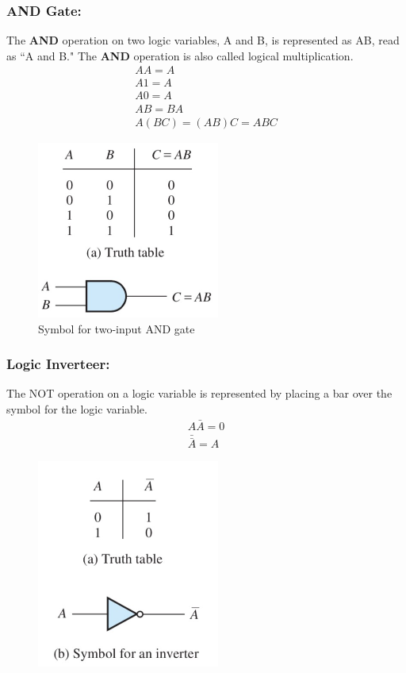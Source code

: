 \documentclass[a4paper,12]{article}
\begin{document}
     \subsubsection{AND Gate:}
     The \textbf{AND} operation on two logic variables, A and B, is represented as AB, read as ``A and B." The \textbf{AND} operation is also called logical multiplication.
     \begin{gather}
         AA=A\\
         A1=A\\
         A0=A\\
         AB=BA\\
         A(BC)=(AB)C=ABC
     \end{gather}
     \begin{figure}[H]
         \centering
         \captionsetup{labelformat=empty}
         \includegraphics[width=60mm]{Image/35.jpg}
        \caption{Symbol for two-input AND gate}
     \end{figure}
     \subsubsection{Logic Inverteer:}
     The NOT operation on a logic variable is represented by placing a bar over the symbol for the logic variable. 
     \begin{gather}
         A\bar{A}=0\\
       \bar{\bar{A}}=A
     \end{gather}
     \begin{figure}[H]
         \centering
         \includegraphics[width=60mm]{Image/36.jpg}
     \end{figure}
\end{document}
